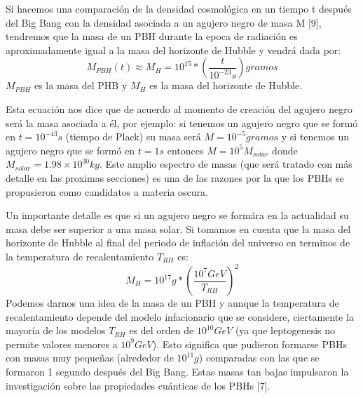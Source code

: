 \documentclass{article}
\begin{document}
Si hacemos una comparaci\'on de la densidad cosmol\'ogica en un tiempo t despu\'es del Big Bang con la densidad asociada a un agujero negro de masa M [9], tendremos que la masa de un PBH durante la epoca de radiaci\'on es aproximadamente igual a la masa del horizonte de Hubble y vendr\'a dada por:
\begin{equation}
M_{PBH}(t)\approx M_H=10^{15}*\left(\frac{t}{10^{-23} s}\right)  gramos
\end{equation}
$M_{PBH}$ es la masa del PHB y $M_H$ es la masa del horizonte de Hubble.

Esta ecuaci\'on nos dice que de acuerdo al momento de creaci\'on del agujero negro ser\'a la masa asociada a \'el, por ejemplo: si tenemos un agujero negro que se form\'o en $t=10^{-43} s$ (tiempo de Plack) su masa ser\'a $M=10^{-5} gramos$ y si tenemos un agujero negro que se form\'o en $t=1 s$ entonces $M=10^{5} M_{solar}$ donde $M_{solar}=1.98\times10^{30} kg$. Este amplio espectro de masas (que ser\'a tratado con m\'as detalle en las proximas secciones) es una de las razones por la que los PBHs se propusieron como candidatos a materia oscura.

Un importante detalle es que si un agujero negro se form\'ara en la actualidad su masa debe ser superior a una masa solar.
Si tomamos en cuenta que la masa del horizonte de Hubble al final del periodo de inflaci\'on del universo en terminos de la temperatura de recalentamiento $T_{RH}$ es:
\begin{equation}
M_H=10^{17}g*\left(\frac{10^{7}GeV}{T_{RH}}\right)^{2}
\end{equation}
Podemos darnos una idea de la masa de un PBH y aunque la temperatura de recalentamiento depende del modelo infacionario que se considere, ciertamente la mayor\'ia de los modelos $T_{RH}$ es del orden de $10^{10} GeV$ (ya que leptogenesis no permite valores menores a $10^{9} GeV$).
Esto significa que pudieron formarse PBHs con masas muy peque\~{n}as (alrededor de $10^{11} g$) comparadas con las que se formaron 1 segundo despu\'es del Big Bang. Estas masas tan bajas impulsaron la investigaci\'on sobre las propiedades cu\'anticas de los PBHs [7].
\end{document}
